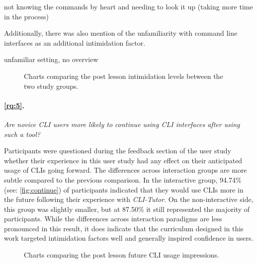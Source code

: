 \begin{quotes}
	not knowing the commands by heart and needing to look it up (taking more time in the
	process)
\end{quotes}

Additionally, there was also mention of the unfamiliarity with command line
interfaces as an additional intimidation factor.

\begin{quotes}
	unfamiliar setting, no overview
\end{quotes}


\begin{figure}[htbp]
	\centering
	\scalebox{0.67}{}
	\caption{Charts comparing the post lesson intimidation levels between the two study groups.}
	\label{fig:confidence}
\end{figure}
\clearpage

\paragraph{\ref{rq:5}.} \textit{Are novice CLI users more likely to continue using CLI interfaces
	after using such a tool?}

Participants were questioned during the feedback section of the user study
whether their experience in this user study had any effect on their anticipated
usage of CLIs going forward. The differences across interaction groups are more
subtle compared to the previous comparison. In the interactive group, 94.74\%
(see: \autoref{fig:continue}) of participants indicated that they would use
CLIs more in the future following their experience with \textit{CLI-Tutor}. On
the non-interactive side, this group was slightly smaller, but at 87.50\% it
still represented the majority of participants. While the differences across
interaction paradigms are less pronounced in this result, it does indicate that
the curriculum designed in this work targeted intimidation factors well and
generally inspired confidence in users.

\begin{figure}[htbp]
	\centering
	\scalebox{0.67}{}
	\caption{Charts comparing the post lesson future CLI usage impressions.}
	\label{fig:continue}
\end{figure}
